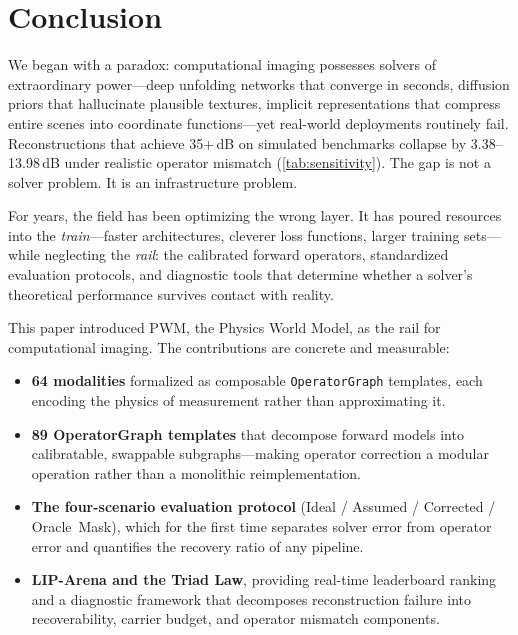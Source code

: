 
\section{Conclusion}
\label{sec:conclusion}

We began with a paradox: computational imaging possesses solvers of
extraordinary power---deep unfolding networks that converge in seconds,
diffusion priors that hallucinate plausible textures, implicit
representations that compress entire scenes into coordinate
functions---yet real-world deployments routinely fail.  Reconstructions
that achieve 35+\,dB on simulated benchmarks collapse by 3.38--13.98\,dB under
realistic operator mismatch (\cref{tab:sensitivity}).  The gap is not a solver problem.
It is an infrastructure problem.

For years, the field has been optimizing the wrong layer.  It has
poured resources into the \emph{train}---faster architectures, cleverer
loss functions, larger training sets---while neglecting the
\emph{rail}: the calibrated forward operators, standardized evaluation
protocols, and diagnostic tools that determine whether a solver's
theoretical performance survives contact with reality.

This paper introduced PWM, the Physics World Model, as the rail for
computational imaging.  The contributions are concrete and measurable:

\begin{itemize}
  \item \textbf{64 modalities} formalized as composable
        \texttt{OperatorGraph} templates, each encoding the physics of
        measurement rather than approximating it.
  \item \textbf{89 OperatorGraph templates} that decompose forward models
        into calibratable, swappable subgraphs---making operator
        correction a modular operation rather than a monolithic
        reimplementation.
  \item \textbf{The four-scenario evaluation protocol}
        (Ideal / Assumed / Corrected / Oracle~Mask), which for the first
        time separates solver error from operator error and quantifies
        the recovery ratio of any pipeline.
  \item \textbf{LIP-Arena and the Triad Law}, providing real-time
        leaderboard ranking and a diagnostic framework that decomposes
        reconstruction failure into recoverability, carrier budget, and
        operator mismatch components.
\end{itemize}

